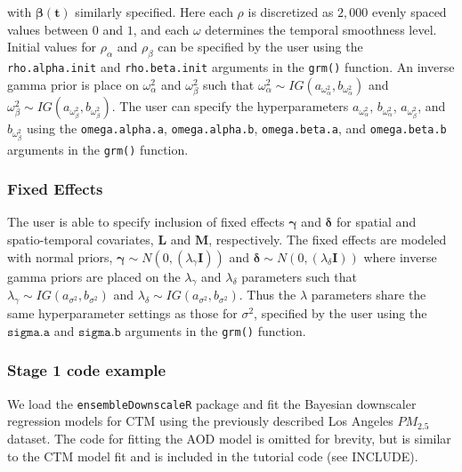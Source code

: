 \documentclass[12pt]{article}
\newcommand{\bs}{\boldsymbol}
\newcommand{\bl}{\mathbf}
\begin{document}
with $\bs{\beta}(\bl{t})$ similarly specified. 
Here each $\rho$ is discretized as $2,000$ evenly spaced values between $0$ and $1$, and each $\omega$ determines the temporal smoothness level. 
Initial values for $\rho_{\alpha}$ and $\rho_{\beta}$ can be specified by the user using the \texttt{rho.alpha.init} and \texttt{rho.beta.init} arguments in the \texttt{grm()} function.
An inverse gamma prior is place on $\omega^2_{\alpha}$ and $\omega^2_{\beta}$ such that $\omega^2_{\alpha} \sim IG(a_{\omega_{\alpha}^2}, b_{\omega_{\alpha}^2})$ and $\omega^2_{\beta} \sim IG(a_{\omega_{\beta}^2}, b_{\omega_{\beta}^2})$.
The user can specify the hyperparameters $a_{\omega_{\alpha}^2}$, $b_{\omega_{\alpha}^2}$, $a_{\omega_{\beta}^2}$, and $b_{\omega_{\beta}^2}$ using the \texttt{omega.alpha.a}, \texttt{omega.alpha.b}, \texttt{omega.beta.a}, and \texttt{omega.beta.b} arguments in the \texttt{grm()} function.

\subsubsection*{Fixed Effects}

The user is able to specify inclusion of fixed effects $\mathbf{\gamma}$ and $\mathbf{\delta}$ for spatial and spatio-temporal covariates, $\bl{L}$ and $\bl{M}$, respectively. 
The fixed effects are modeled with normal priors, $\bs{\gamma} \sim N(0, (\lambda_{\gamma}\bs{I}))$ and $\bs{\delta} \sim N(0, (\lambda_{\delta}\bs{I}))$ where inverse gamma priors are placed on the $\lambda_{\gamma}$ and $\lambda_{\delta}$ parameters such that $\lambda_{\gamma} \sim IG(a_{\sigma^2}, b_{\sigma^2})$ and $\lambda_{\delta} \sim IG(a_{\sigma^2}, b_{\sigma^2})$.
Thus the $\lambda$ parameters share the same hyperparameter settings as those for $\sigma^2$, specified by the user using the $\texttt{sigma.a}$ and $\texttt{sigma.b}$ arguments in the \texttt{grm()} function.


\subsubsection*{Stage 1 code example}

We load the \texttt{ensembleDownscaleR} package and fit the Bayesian downscaler regression models for CTM using the previously described Los Angeles $PM_{2.5}$ dataset.
The code for fitting the AOD model is omitted for brevity, but is similar to the CTM model fit and is included in the tutorial code (see INCLUDE).
\end{document}

